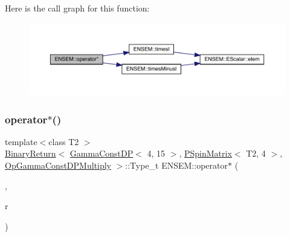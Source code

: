 Here is the call graph for this function\+:\nopagebreak
\begin{figure}[H]
\begin{center}
\leavevmode
\includegraphics[width=350pt]{d6/df5/group__primspinmatrix_ga3572342590fe6c5683d22d857b757675_cgraph}
\end{center}
\end{figure}
\mbox{\label{group__primspinmatrix_gafeff9dceaf056bcf56866006862373d8}} 
\subsubsection{\texorpdfstring{operator$\ast$()}{operator*()}\hspace{0.1cm}{\footnotesize\ttfamily [48/64]}}
{\footnotesize\ttfamily template$<$class T2 $>$ \\
\mbox{\hyperlink{structENSEM_1_1BinaryReturn}{Binary\+Return}}$<$ \mbox{\hyperlink{classENSEM_1_1GammaConstDP}{Gamma\+Const\+DP}}$<$ 4, 15 $>$, \mbox{\hyperlink{classENSEM_1_1PSpinMatrix}{P\+Spin\+Matrix}}$<$ T2, 4 $>$, \mbox{\hyperlink{structENSEM_1_1OpGammaConstDPMultiply}{Op\+Gamma\+Const\+D\+P\+Multiply}} $>$\+::Type\+\_\+t E\+N\+S\+E\+M\+::operator$\ast$ (\begin{DoxyParamCaption}\item[{const \mbox{\hyperlink{classENSEM_1_1GammaConstDP}{Gamma\+Const\+DP}}$<$ 4, 15 $>$ \&}]{,  }\item[{const \mbox{\hyperlink{classENSEM_1_1PSpinMatrix}{P\+Spin\+Matrix}}$<$ T2, 4 $>$ \&}]{r }\end{DoxyParamCaption})\hspace{0.3cm}{\ttfamily [inline]}}

\mbox{\label{group__primspinmatrix_ga922c6c72866d31038a56946930310c35}} 
